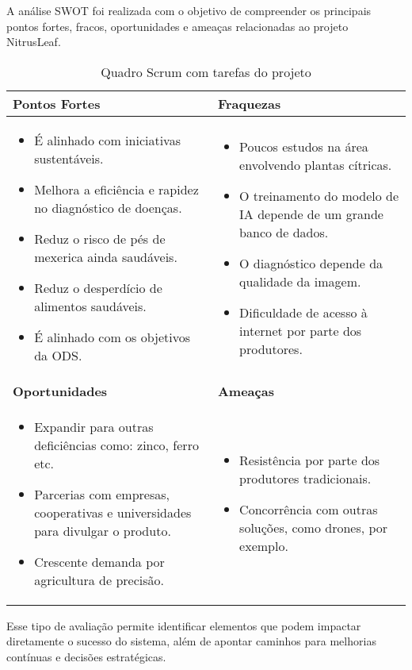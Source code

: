 A análise SWOT foi realizada com o objetivo de compreender os principais
pontos fortes, fracos, oportunidades e ameaças relacionadas ao projeto NitrusLeaf.

\begin{table}[h]
\centering
\caption{Quadro Scrum com tarefas do projeto}
\renewcommand{\arraystretch}{1.2}
\begin{tabularx}{\textwidth}{|>{\raggedright\arraybackslash}X|>{\raggedright\arraybackslash}X|}
\hline
\textbf{Pontos Fortes} & \textbf{Fraquezas} \\
\hline
\begin{itemize}[left=0pt]
  \item É alinhado com iniciativas sustentáveis.
  \item Melhora a eficiência e rapidez no diagnóstico de doenças.
  \item Reduz o risco de pés de mexerica ainda saudáveis.
  \item Reduz o desperdício de alimentos saudáveis.
  \item É alinhado com os objetivos da ODS.
\end{itemize}
&
\begin{itemize}[left=0pt]
  \item Poucos estudos na área envolvendo plantas cítricas.
  \item O treinamento do modelo de IA depende de um grande banco de dados.
  \item O diagnóstico depende da qualidade da imagem.
  \item Dificuldade de acesso à internet por parte dos produtores.
\end{itemize}
\\
\hline
\textbf{Oportunidades} & \textbf{Ameaças} \\
\hline
\begin{itemize}[left=0pt]
  \item Expandir para outras deficiências como: zinco, ferro etc.
  \item Parcerias com empresas, cooperativas e universidades para divulgar o produto.
  \item Crescente demanda por agricultura de precisão.
\end{itemize}
&
\begin{itemize}[left=0pt]
  \item Resistência por parte dos produtores tradicionais.
  \item Concorrência com outras soluções, como drones, por exemplo.
\end{itemize}
\\
\hline
\end{tabularx}
\medskip
{}
\end{table}
\FloatBarrier
\medskip
Esse tipo de avaliação permite identificar elementos que podem impactar
diretamente o sucesso do sistema, além de apontar caminhos para melhorias contínuas
e decisões estratégicas.
